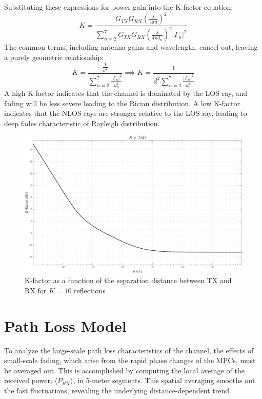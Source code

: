 Substituting these expressions for power gain into the K-factor equation:
\begin{equation}
	K = \frac{G_{TX} G_{RX} \left( \frac{\lambda}{4\pi d} \right)^2}{\sum_{n=2}^{7} G_{TX} G_{RX} \left( \frac{\lambda}{4\pi d_n} \right)^2 |\Gamma_n|^2}
\end{equation}
The common terms, including antenna gains and wavelength, cancel out, leaving a purely geometric relationship:
\begin{equation}
	K = \frac{\frac{1}{d^2}}{\sum_{n=2}^{7} \frac{|\Gamma_n|^2}{d_n^2}} \implies \boxed{K =\frac{1}{d^2 \sum_{n=2}^{7} \frac{|\Gamma_n|^2}{d_n^2}}}
\end{equation}
A high K-factor indicates that the channel is dominated by the LOS ray, and fading will be less severe leading to the Rician distribution. A low K-factor indicates that the NLOS rays are stronger relative to the LOS ray, leading to deep fades characteristic of Rayleigh distribution.

\begin{figure}
	\centering
	\includegraphics[width=\linewidth]{content/4-images/k-factor}
	\caption{K-factor as a function of the separation distance between TX and RX for $K=10$ reflections}
	\label{fig:k-factor}
\end{figure}




\section{Path Loss Model}
To analyze the large-scale path loss characteristics of the channel, the effects of small-scale fading, which arise from the rapid phase changes of the MPCs, must be averaged out. This is accomplished by computing the local average of the received power, $\langle P_{RX} \rangle$, in 5-meter segments. This spatial averaging smooths out the fast fluctuations, revealing the underlying distance-dependent trend.

